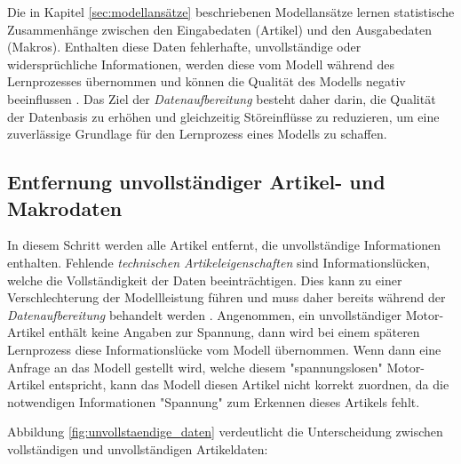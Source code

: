 Die in Kapitel \ref{sec:modellansätze} beschriebenen Modellansätze lernen statistische Zusammenhänge zwischen den Eingabedaten (Artikel) und den Ausgabedaten (Makros).
Enthalten diese Daten fehlerhafte, unvollständige oder widersprüchliche Informationen, 
werden diese vom Modell während des Lernprozesses übernommen und können die Qualität des Modells negativ beeinflussen \cite{emmanuel2021missing,hastie2009elements}. 
Das Ziel der \textit{Datenaufbereitung} besteht daher darin, die Qualität der Datenbasis zu erhöhen und gleichzeitig Störeinflüsse zu reduzieren, um eine zuverlässige Grundlage für den Lernprozess eines Modells zu schaffen.

\subsection{Entfernung unvollständiger Artikel- und Makrodaten}
\label{sec:entfernen_unvollständiger_artikel_und_makrodaten}

In diesem Schritt werden alle Artikel entfernt, die unvollständige Informationen enthalten. 
Fehlende \textit{technischen Artikeleigenschaften} sind Informationslücken, welche die Vollständigkeit der Daten beeinträchtigen. 
Dies kann zu einer Verschlechterung der Modellleistung führen und muss daher bereits während der \textit{Datenaufbereitung} behandelt werden \cite{emmanuel2021missing}.
Angenommen, ein unvollständiger Motor-Artikel enthält keine Angaben zur Spannung, dann wird bei einem späteren Lernprozess diese Informationslücke vom Modell übernommen. 
Wenn dann eine Anfrage an das Modell gestellt wird, welche diesem "spannungslosen" Motor-Artikel entspricht, kann das Modell diesen Artikel nicht korrekt zuordnen, 
da die notwendigen Informationen "Spannung" zum Erkennen dieses Artikels fehlt.

Abbildung \ref{fig:unvollstaendige_daten} verdeutlicht die Unterscheidung zwischen vollständigen und unvollständigen Artikeldaten:

